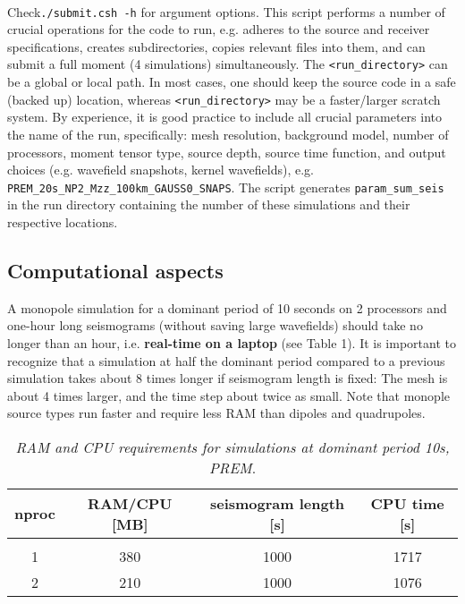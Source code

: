 \documentclass[11pt,letter,fleqn,english,notitlepage]{article}
\begin{document}
\\ 
Check{\tt ./submit.csh -h} for argument options. 
This script performs a number of crucial operations for the code to run, e.g. adheres to 
the source and receiver specifications, creates subdirectories, copies relevant files into them,
and can submit a full moment (4 simulations) simultaneously.
The {\tt <run\_directory>} can be a global or local path. In most cases, one should keep the source code in a 
safe (backed up) location, whereas {\tt <run\_directory>} may be a faster/larger scratch system. 
By experience, it is good practice to include all crucial parameters into the name 
of the run, specifically: mesh resolution, background model, number of processors, 
moment tensor type, source depth, source time function, and output choices (e.g. wavefield snapshots, kernel wavefields), e.g.
{\tt PREM\_20s\_NP2\_Mzz\_100km\_GAUSS0\_SNAPS}. 
The script generates {\tt param\_sum\_seis} in the run directory containing the number of these simulations 
and their respective locations. 

\subsection{Computational aspects}
\noindent A monopole simulation for a dominant period of 10 seconds on 2 processors and 
one-hour long seismograms (without saving large wavefields) should take no longer than 
an hour, i.e. \textbf{real-time on a laptop} (see Table 1). 
It is important to recognize that a simulation at half the dominant period compared to a previous simulation 
takes about 8 times longer if seismogram length is fixed: The mesh is about 4 times larger, and the time step about twice as small.
Note that monople source types run faster and require less RAM than dipoles and quadrupoles.\\

\begin{table*}[htb] 
\begin{minipage}{150mm}
\caption{ \textit{RAM and CPU requirements for simulations at dominant period 10s, PREM}.}
\label{apptable:matrix_op}
\vspace*{.2cm}
\begin{tabular}{@{}cccc}
nproc & RAM/CPU [MB] & seismogram length [s]& CPU time [s]\\
\hline\\
1 & 380 & 1000 & 1717\\
2 & 210 & 1000 & 1076
\end{tabular}
\end{minipage}
\end{table*}
\end{document}
